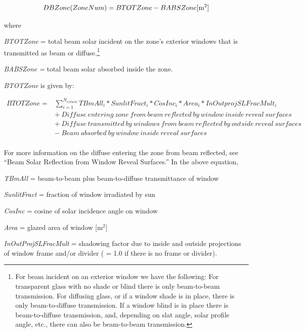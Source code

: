 \begin{equation}
DBZone(ZoneNum) = BTOTZone - BABSZone{\rm{    [}}{{\rm{m}}^{\rm{2}}}]
\end{equation}

where

\emph{BTOTZone} = total beam solar incident on the zone's exterior windows that is transmitted as beam or diffuse.\footnote{For beam incident on an exterior window we have the following: For transparent glass with no shade or blind there is only beam-to-beam transmission. For diffusing glass, or if a window shade is in place, there is only beam-to-diffuse transmission. If a window blind is in place there is beam-to-diffuse transmission, and, depending on slat angle, solar profile angle, etc., there can also be beam-to-beam transmission.}

\emph{BABSZone =} total beam solar absorbed inside the zone.

\emph{BTOTZone} is given by:

\begin{equation}
\begin{array}{rl}
BTOTZone = & \sum\limits_{i = 1}^{{N_{extwin}}} {TBmAl{l_i}*SunlitFrac{t_i}*CosIn{c_i}*Are{a_i}*InOutprojSLFracMul{t_i}} \\
           & +~Diffuse~entering~zone~from~beam~reflected~by~window~inside~reveal~surfaces \\
           & +~Diffuse~transmitted~by~windows~from~beam~reflected~by~outside~reveal~surfaces \\
           & -~Beam~absorbed~by~window~inside~reveal~surfaces \\
\end{array}
\end{equation}

For more information on the diffuse entering the zone from beam reflected, see ``Beam Solar Reflection from Window Reveal Surfaces.''  In the above equation,

\emph{TBmAll} = beam-to-beam plus beam-to-diffuse transmittance of window

\emph{SunlitFract} = fraction of window irradiated by sun

\emph{CosInc} = cosine of solar incidence angle on window

\emph{Area} = glazed area of window {[}m\(^{2}\){]}

\emph{InOutProjSLFracMult} = shadowing factor due to inside and outside projections of window frame and/or divider ( = 1.0 if there is no frame or divider).

